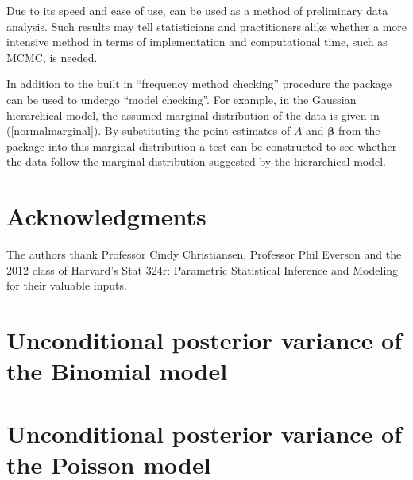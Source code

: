 \documentclass[article]{jss}
\begin{document}
Due to its speed and ease of use,  can be used as a method of preliminary data analysis. Such results may tell statisticians and practitioners alike whether a more intensive method in terms of implementation and computational time, such as MCMC, is needed. 


In addition to the built in ``frequency method checking'' procedure the package can be used to undergo ``model checking''. For example, in the Gaussian hierarchical model, the assumed marginal distribution of the data is given in (\ref{normalmarginal}). By substituting the point estimates of $A$ and $\boldsymbol{\beta}$ from the package into this marginal distribution a test can be constructed to see whether the data follow the marginal distribution suggested by the hierarchical model.


\section[acknowledgments]{Acknowledgments}
The authors thank Professor Cindy Christiansen, Professor Phil Everson and the 2012 class of Harvard's Stat 324r: Parametric Statistical Inference and Modeling for their valuable inputs.

\appendix
\section{Unconditional posterior variance of the Binomial model}\label{apppostvar}

\section{Unconditional posterior variance of the Poisson model}\label{apppostvar_poisson}


\end{document}
